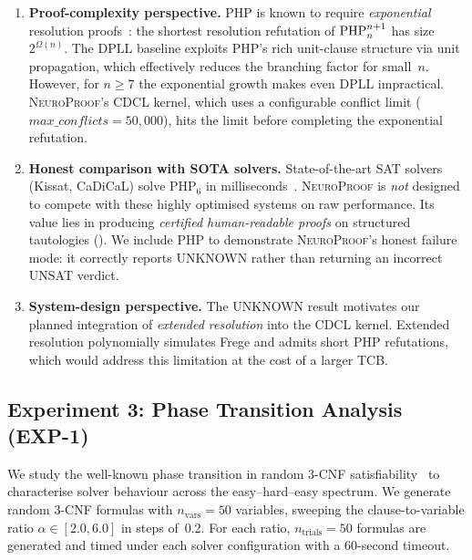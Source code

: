 \documentclass[conference]{IEEEtran}
\newcommand{\NP}{\textsc{NeuroProof}}
\newcommand{\PHP}{\textnormal{PHP}}
\begin{document}
\begin{enumerate}
  \item \textbf{Proof-complexity perspective.}  PHP is known to require
    \emph{exponential} resolution
    proofs~\cite{Pitassi1998,Ben-Sasson2001}: the shortest
    resolution refutation of $\PHP_n^{n+1}$ has size
    $2^{\Omega(n)}$.  The DPLL baseline exploits PHP's rich
    unit-clause structure via unit propagation, which effectively
    reduces the branching factor for small~$n$.  However, for $n \geq 7$
    the exponential growth makes even DPLL impractical.
    \NP{}'s CDCL kernel, which uses a configurable conflict limit
    ($\mathit{max\_conflicts} = 50{,}000$), hits the limit before
    completing the exponential refutation.

  \item \textbf{Honest comparison with SOTA solvers.}
    State-of-the-art SAT solvers (Kissat, CaDiCaL) solve PHP$_6$ in
    milliseconds~\cite{BiereSATCompetition2024}.  \NP{} is \emph{not}
    designed to compete with these highly optimised systems on
    raw performance.  Its value lies in producing \emph{certified
    human-readable proofs} on structured tautologies
    ().  We include PHP to demonstrate
    \NP{}'s honest failure mode: it correctly reports UNKNOWN rather
    than returning an incorrect UNSAT verdict.

  \item \textbf{System-design perspective.}  The UNKNOWN result
    motivates our planned integration of \emph{extended resolution}
    into the CDCL kernel.  Extended resolution polynomially
    simulates Frege and admits short PHP refutations, which would
    address this limitation at the cost of a larger TCB.
\end{enumerate}

\subsection{Experiment 3: Phase Transition Analysis \textnormal{(EXP-1)}}

We study the well-known phase transition in random 3-CNF
satisfiability~\cite{Cheeseman1986,Kirkpatrick1994} to
characterise solver behaviour across the easy--hard--easy
spectrum.  We generate random 3-CNF formulas with
$n_{\text{vars}}=50$ variables, sweeping the clause-to-variable
ratio $\alpha \in [2.0, 6.0]$ in steps of~0.2.  For each ratio,
$n_{\text{trials}}=50$ formulas are generated and timed under each
solver configuration with a 60-second timeout.
\end{document}
